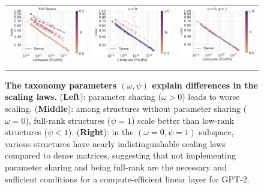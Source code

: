 \documentclass{article}
\begin{document}
\begin{figure}[!t]
\centering
    \begin{tabular}{ccc}
    \hspace{-4mm}
    \includegraphics[height=0.28\linewidth]{figs/omega.pdf} &
    \hspace{-5mm}
    \includegraphics[height=0.28\linewidth, trim=3cm 0cm 0cm 0cm, clip]{figs/psi.pdf} &
    \hspace{-5mm}
    \includegraphics[height=0.28\linewidth, trim=3cm 0cm 0cm 0cm, clip]{figs/nu.pdf}
      \\
    \hspace{-6mm}{\small Effect of $\omega$} &
    \hspace{-12mm}{\small Effect of $\psi$} &
    \hspace{-14mm}{\small Effect of $\nu$}
    \end{tabular}
   \caption{
   \textbf{The taxonomy parameters $(\omega, \psi)$ explain differences in the scaling laws.} (\textbf{Left}): parameter sharing ($\omega > 0$) leads to worse scaling. (\textbf{Middle}): among structures without parameter sharing ($\omega = 0$), full-rank structures ($\psi=1$) scale better than low-rank structures ($\psi<1$). (\textbf{Right}): in the $(\omega = 0, \psi = 1)$ subspace, various structures have nearly indistinguishable scaling laws compared to dense matrices, suggesting that not implementing parameter sharing and being full-rank are the necessary and sufficient conditions for a compute-efficient linear layer for GPT-2.
   }
    \label{fig:scaling_laws_analysis}
    \vspace{-2mm}
\end{figure}
\end{document}
